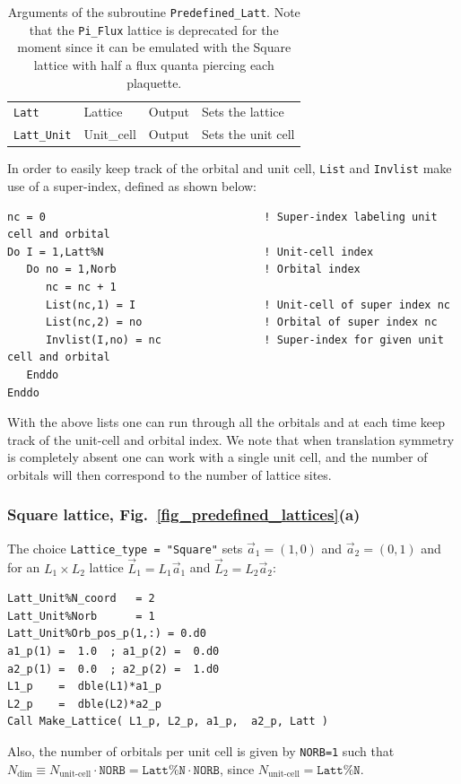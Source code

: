 \begin{table}[h!]
\begin{center}
\begin{tabular}{@{} p{}  p{} p{} p{}  @{}}
		\texttt{Latt}            & Lattice    & Output & Sets the lattice\\
		\texttt{Latt\_Unit}      & Unit\_cell & Output & Sets the unit cell\\
		\bottomrule
	\end{tabular}
\caption{Arguments of the subroutine \texttt{Predefined\_Latt}.   Note that the \texttt{Pi\_Flux} lattice is deprecated for the moment since it can be emulated with the Square lattice with half a flux quanta piercing each plaquette.}		\label{table:predefined_lattices}
\end{center}
\end{table}

In order to easily keep track of the orbital and unit cell, \texttt{List} and \texttt{Invlist} make use of a super-index, defined as shown below:
\begin{lstlisting}[style=fortran]
nc = 0                                  ! Super-index labeling unit cell and orbital
Do I = 1,Latt%N                         ! Unit-cell index 
   Do no = 1,Norb                       ! Orbital index
      nc = nc + 1
      List(nc,1) = I                    ! Unit-cell of super index nc
      List(nc,2) = no                   ! Orbital of super index nc
      Invlist(I,no) = nc                ! Super-index for given unit cell and orbital
   Enddo
Enddo
\end{lstlisting}
With the above lists one can run through all the orbitals and at each time keep track of the unit-cell and orbital index. We note that when translation symmetry is completely absent one can work with a single unit cell, and the number of orbitals will then correspond to the number of lattice sites. 

\subsubsection{Square lattice, Fig.~\ref{fig_predefined_lattices}(a)}

The choice \texttt{Lattice\_type = "Square"}   sets $\vec{a}_1 =  (1,0) $ and $\vec{a}_2 =  (0,1) $  and for an $L_1 \times L_2$  lattice  $\vec{L}_1 = L_1 \vec{a}_1$ and  $\vec{L}_2 = L_2 \vec{a}_2$:
\begin{lstlisting}[style=fortran]
Latt_Unit%N_coord   = 2
Latt_Unit%Norb      = 1
Latt_Unit%Orb_pos_p(1,:) = 0.d0 
a1_p(1) =  1.0  ; a1_p(2) =  0.d0
a2_p(1) =  0.0  ; a2_p(2) =  1.d0
L1_p    =  dble(L1)*a1_p
L2_p    =  dble(L2)*a2_p
Call Make_Lattice( L1_p, L2_p, a1_p,  a2_p, Latt )
\end{lstlisting}
Also, the number of orbitals per unit cell is given by \texttt{NORB=1} such that   $N_{\mathrm{dim}}   \equiv N_{\text{unit-cell}}   \cdot \texttt{NORB}  = \texttt{Latt\%N} \cdot \texttt{NORB}$, since $N_{\text{unit-cell}} = \texttt{Latt\%N}$.

